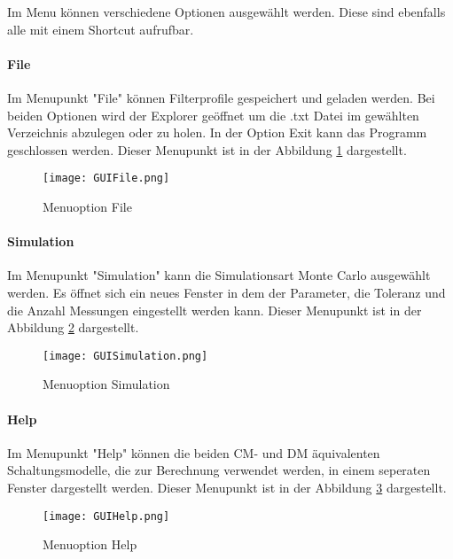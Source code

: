 Im Menu können verschiedene Optionen ausgewählt werden. Diese sind ebenfalls alle mit einem Shortcut aufrufbar.
\bigskip
{}
\paragraph{File} \label{para:file}
Im Menupunkt "File" können Filterprofile gespeichert und geladen werden. Bei beiden Optionen wird der Explorer geöffnet um die .txt Datei im gewählten Verzeichnis abzulegen oder zu holen. In der Option Exit kann das Programm geschlossen werden. Dieser Menupunkt ist in der Abbildung \ref{fig:GUIFile}  dargestellt.

\begin{figure}[H]
	\centering
	\texttt{[image: GUIFile.png]}
	\caption{Menuoption File}
	\label{fig:GUIFile}
\end{figure}

\bigskip

\paragraph{Simulation} \label{para:simulation}
Im Menupunkt "Simulation" kann die Simulationsart Monte Carlo ausgewählt werden. Es öffnet sich ein neues Fenster in dem der Parameter, die Toleranz und die Anzahl Messungen eingestellt werden kann. Dieser Menupunkt ist in der Abbildung \ref{fig:GUISimulation} dargestellt.

\begin{figure}[H]
	\centering
	\texttt{[image: GUISimulation.png]}
	\caption{Menuoption Simulation}
	\label{fig:GUISimulation}
\end{figure}

\bigskip

\paragraph{Help} \label{para:Help}
Im Menupunkt "Help" können die beiden CM- und DM äquivalenten Schaltungsmodelle, die zur Berechnung verwendet werden, in einem seperaten Fenster dargestellt werden. Dieser Menupunkt ist in der Abbildung \ref{fig:GUIHelp}  dargestellt.

\begin{figure}[H]
	\centering
	\texttt{[image: GUIHelp.png]}
	\caption{Menuoption Help}
	\label{fig:GUIHelp}
\end{figure}
\newpage

